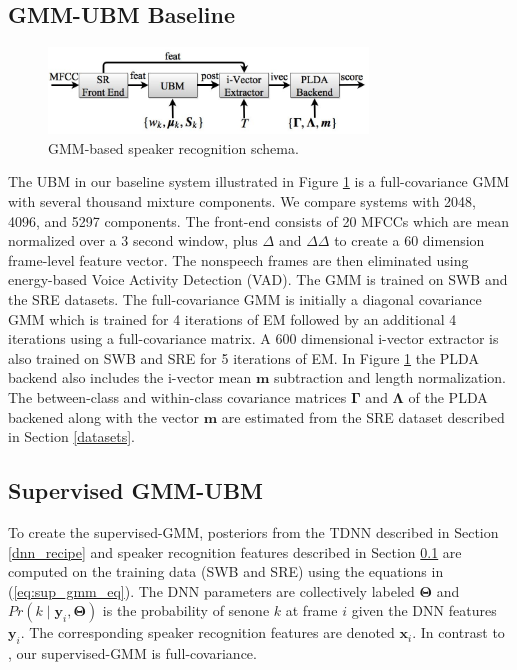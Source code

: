 \documentclass{article}
\begin{document}
\subsection{GMM-UBM Baseline}
\label{gmm_sys}

\begin{figure}[th]
\centerline{\includegraphics[width=8.5cm]{fig/baseline_schema}}
\caption{GMM-based speaker recognition schema.}
\label{fig:gmm_schema}
\end{figure}

The UBM in our baseline system illustrated in Figure \ref{fig:gmm_schema} 
is a full-covariance
GMM with several thousand mixture components. We compare systems with
2048, 4096, and 5297 components. The front-end consists of 20 MFCCs which
are mean normalized over a 3 second window, plus $\Delta$ 
and $\Delta \Delta$ to create a 60 dimension frame-level feature vector.
The nonspeech frames are then eliminated using
energy-based Voice Activity Detection (VAD). The GMM is trained on SWB
and the SRE datasets. The 
full-covariance GMM is initially a diagonal
covariance GMM which is trained for 4 iterations of EM followed by
an additional 4 iterations using a full-covariance matrix.
 A 600 dimensional i-vector extractor is also trained on 
SWB and SRE for 5 iterations of EM. In Figure \ref{fig:gmm_schema} the PLDA
backend also includes the i-vector mean $\boldsymbol{m}$ subtraction and
length normalization. The between-class and within-class
covariance matrices $\boldsymbol{\Gamma}$ and $\boldsymbol{\Lambda}$ of the PLDA backened along with
the vector $\boldsymbol{m}$ are estimated from the SRE dataset described 
in Section \ref{datasets}.

\subsection{Supervised GMM-UBM}
\label{sup_gmm_sys}

To create the supervised-GMM, posteriors from the TDNN described in Section \ref{dnn_recipe}
and speaker recognition
features described in Section \ref{gmm_sys} are computed on the training data (SWB and SRE)
 using the
equations in (\ref{eq:sup_gmm_eq}). The DNN parameters are collectively
labeled $\boldsymbol{\Theta}$ and 
$Pr(k \mid \boldsymbol{y}_{i}, \boldsymbol{\Theta})$ is the
probability of senone $k$ at frame $i$ given the DNN features $\boldsymbol{y}_{i}$. The
corresponding speaker recognition features are denoted $\boldsymbol{x}_{i}$.
In contrast to \cite{lei2014}, our supervised-GMM is full-covariance.
\end{document}

